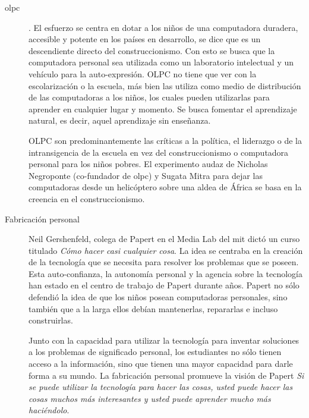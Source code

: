 \begin{description}


\item[\Gls{olpc}]. El esfuerzo se centra en dotar a los niños de una computadora
	duradera, accesible y potente en los países en desarrollo, se dice que
	es un descendiente directo del construccionismo. Con esto se busca que
	la computadora personal sea utilizada como un laboratorio intelectual y
	un vehículo para la auto-expresión. OLPC no tiene que ver con la
	escolarización o la escuela, más bien las utiliza como medio de
	distribución de las computadoras a los niños, los cuales pueden
	utilizarlas para aprender en cualquier lugar y momento. Se busca
	fomentar el aprendizaje natural, es decir, aquel aprendizaje sin
	enseñanza.

     OLPC son
    predominantemente las críticas a la política, el liderazgo o de la
    intransigencia de la escuela en vez del construccionismo o computadora
    personal para los niños pobres. El experimento audaz de Nicholas Negroponte
    (co-fundador de \Gls{olpc}) y Sugata Mitra para dejar las computadoras desde
    un helicóptero sobre una aldea de África se basa en la creencia en el
    construccionismo\cite{papertian:const}.


\item[Fabricación personal] Neil Gershenfeld, colega de Papert en el Media Lab
	del \Gls{mit} dictó un curso titulado \emph{Cómo hacer casi cualquier
		cosa}. La idea se centraba en la creación de  la tecnología que
	se necesita para resolver los problemas que se poseen. Esta
	auto-confianza, la autonomía personal y la agencia sobre la tecnología
	han estado en el centro de trabajo de Papert durante años. Papert no
	sólo defendió la idea de que los niños posean computadoras personales,
	sino también que a la larga ellos debían mantenerlas, repararlas e
	incluso construirlas.

	Junto con la capacidad para utilizar la tecnología para inventar
	soluciones a los problemas de significado personal, los estudiantes no
	sólo tienen acceso a la información, sino que tienen una mayor capacidad
	para darle forma a su mundo. La fabricación personal promueve la visión
	de Papert \emph{Si se puede utilizar la tecnología para hacer las cosas,
		usted puede hacer las cosas muchos más interesantes y usted
		puede aprender mucho más haciéndolo}\cite{papertian:const}.

\end{description}


